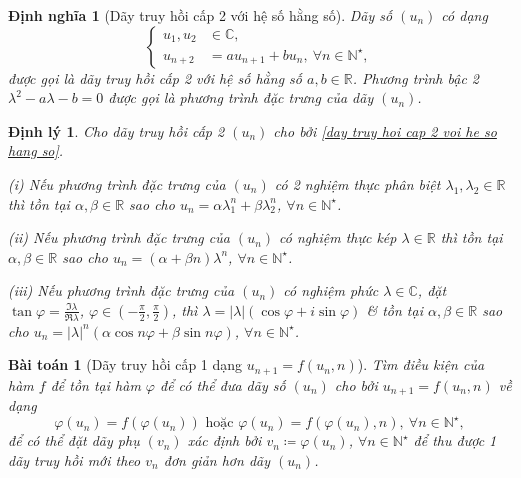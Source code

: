 \documentclass{article}
\newtheorem{baitoan}{Bài toán}
\newtheorem{dinhly}{Định lý}
\newtheorem{dinhnghia}{Định nghĩa}
\begin{document}
\begin{dinhnghia}[Dãy truy hồi cấp 2 với hệ số hằng số]
	Dãy số $(u_n)$ có dạng
	\begin{equation}
		\label{day truy hoi cap 2 voi he so hang so}
		\left\{\begin{split}
			u_1,u_2&\in\mathbb{C},\\
			u_{n+2} &= au_{n+1} + bu_n,\ \forall n\in\mathbb{N}^\star,
		\end{split}\right.
	\end{equation}
	được gọi là {\rm dãy truy hồi cấp 2 với hệ số hằng số} $a,b\in\mathbb{R}$. Phương trình bậc 2 $\lambda^2 - a\lambda - b = 0$ được gọi là {\rm phương trình đặc trưng} của dãy $(u_n)$.
\end{dinhnghia}

\begin{dinhly}
	Cho dãy truy hồi cấp 2 $(u_n)$ cho bởi \eqref{day truy hoi cap 2 voi he so hang so}.
	\item(i) Nếu phương trình đặc trưng của $(u_n)$ có 2 nghiệm thực phân biệt $\lambda_1,\lambda_2\in\mathbb{R}$ thì tồn tại $\alpha,\beta\in\mathbb{R}$ sao cho $u_n = \alpha\lambda_1^n + \beta\lambda_2^n$, $\forall n\in\mathbb{N}^\star$.
	\item(ii) Nếu phương trình đặc trưng của $(u_n)$ có nghiệm thực kép $\lambda\in\mathbb{R}$ thì tồn tại $\alpha,\beta\in\mathbb{R}$ sao cho $u_n = (\alpha + \beta n)\lambda^n$, $\forall n\in\mathbb{N}^\star$.
	\item(iii) Nếu phương trình đặc trưng của $(u_n)$ có nghiệm phức $\lambda\in\mathbb{C}$, đặt $\tan\varphi = \frac{\Im\lambda}{\Re\lambda}$, $\varphi\in\left(-\frac{\pi}{2},\frac{\pi}{2}\right)$, thì $\lambda = |\lambda|(\cos\varphi + i\sin\varphi)$ \& tồn tại $\alpha,\beta\in\mathbb{R}$ sao cho $u_n = |\lambda|^n(\alpha\cos n\varphi + \beta\sin n\varphi)$, $\forall n\in\mathbb{N}^\star$.
\end{dinhly}

\begin{baitoan}[Dãy truy hồi cấp 1 dạng $u_{n+1} = f(u_n,n)$]
	Tìm điều kiện của hàm $f$ để tồn tại hàm $\varphi$ để có thể đưa dãy số $(u_n)$ cho bởi $u_{n+1} = f(u_n,n)$ về dạng
	\begin{equation*}
		\varphi(u_n) = f(\varphi(u_n))\mbox{ hoặc }\varphi(u_n) = f(\varphi(u_n),n),\ \forall n\in\mathbb{N}^\star,
	\end{equation*}
	để có thể đặt dãy phụ $(v_n)$ xác định bởi $v_n\coloneqq\varphi(u_n)$, $\forall n\in\mathbb{N}^\star$ để thu được 1 dãy truy hồi mới theo $v_n$ đơn giản hơn dãy $(u_n)$.
\end{baitoan}
\end{document}
